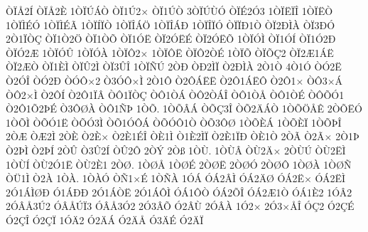{^^d2^^cf^^c52^^cd
^^d2^^cf^^c52^^c8
1^^d2^^cf^^da^^c1^^d2
^^d2^^cf1^^da2^^d7
^^d2^^cf1^^da^^d2
3^^d2^^cf^^da^^d9^^d3
^^d2^^cf^^c92^^d33
1^^d2^^cf^^cb^^cf^^ce
1^^d2^^cf^^cb^^d2
1^^d2^^cf^^cc^^c9^^d3
1^^d2^^cf^^cc^^c9^^c3
1^^d2^^cf^^cd^^cf^^d2
1^^d2^^cf^^ce^^c1^^d6
1^^d2^^cf^^ce^^c1^^d0
1^^d2^^cf^^ce^^cf^^d3
^^d2^^cf^^cf^^d01^^d2
^^d2^^cf2^^d0^^cc^^c0
^^d2^^cf3^^d0^^d3
2^^d21^^cf^^d2^^c7
^^d2^^cf1^^d22^^d6
^^d2^^cf1^^d2^^d5
^^d2^^cf1^^d3^^cb
^^d2^^cf2^^d3^^cb^^c9
^^d2^^cf2^^d3^^cb^^d5
1^^d2^^cf^^d3^^cc
^^d2^^cf1^^d3^^cd
^^d2^^cf1^^d32^^d0
^^d2^^cf^^d32^^c6
1^^d2^^cf^^d3^^db
1^^d2^^cf^^d3^^c0
1^^d2^^cf^^d42^^d7
1^^d2^^cf^^d4^^cb
^^d2^^cf^^d42^^d2^^c9
1^^d2^^cf^^d5
^^d2^^cf^^d5^^c72
^^d2^^cf2^^c61^^c1^^cb
^^d2^^cf2^^c6^^d2
^^d2^^cf1^^c8^^cc
^^d2^^cf^^db2^^cc
^^d2^^cf3^^db^^ce
1^^d2^^cf^^d1^^da
2^^d2^^d0
^^d2^^d02^^cc^^cf
^^d22^^d0^^cc^^c0
2^^d21^^d2
4^^d21^^d3
^^d2^^d32^^cb
^^d22^^d3^^ce
^^d2^^d32^^d0
^^d2^^d3^^d4^^d72
^^d23^^d3^^d4^^d7^^cc
2^^d21^^d4
^^d22^^d4^^c1^^cb^^cb
^^d22^^d41^^c1^^cb^^d4
^^d22^^d41^^d7
^^d2^^d43^^d7^^c1
^^d2^^d42^^d7^^cc
^^d22^^d4^^cd
^^d22^^d41^^cf^^c2
^^d2^^d41^^cf^^d2^^c7
^^d2^^d41^^d2^^c1
^^d2^^d42^^d2^^c1^^ce
^^d2^^d41^^d2^^c5
^^d2^^d41^^d2^^c9
^^d2^^d4^^d5^^d31
^^d22^^d41^^d52^^de^^c9
^^d23^^d4^^d8^^c0
^^d2^^d41^^d1^^de
1^^d2^^d5.
1^^d2^^d5^^c2^^c1
^^d2^^d5^^c73^^ce
^^d2^^d52^^c4^^c1^^d2
1^^d2^^d5^^d6^^c5^^ca
2^^d2^^d5^^cb^^d3
1^^d2^^d5^^cc
^^d2^^d5^^d31^^cb
^^d2^^d5^^d33^^cc
^^d2^^d51^^d3^^d4^^c1
^^d2^^d5^^d3^^d41^^d2
^^d2^^d53^^d4^^d8
1^^d2^^d5^^c8^^c1
1^^d2^^d5^^c8^^cf
1^^d2^^d5^^de^^ce
2^^d2^^c6
^^d2^^c62^^cc
2^^d2^^c8
^^d22^^c8^^d7
^^d22^^c81^^c9^^ce
^^d2^^c81^^cc
^^d21^^c82^^cc^^cf
^^d22^^c81^^cf^^d0
^^d2^^c81^^d2
2^^d2^^c3
^^d22^^c3^^d7
2^^d21^^de
^^d22^^de^^cc
^^d22^^de^^cd
2^^d2^^db
^^d23^^db2^^cd
^^d2^^db2^^d4
2^^d2^^dd
2^^d2^^df
1^^d2^^d9.
1^^d2^^d9^^c2
^^d2^^d92^^c4^^d7
2^^d2^^d9^^da
^^d2^^d92^^cb^^cc
1^^d2^^d9^^cd
^^d2^^d92^^d31^^cb
^^d2^^d92^^c81
2^^d2^^d8.
1^^d2^^d8^^c5
1^^d2^^d8^^c9
2^^d2^^d8^^cb
2^^d2^^d8^^d3
2^^d2^^d8^^d4
1^^d2^^d8^^c0
1^^d2^^d8^^d1
^^d2^^dc1^^cc
^^d22^^c0
1^^d2^^c0.
1^^d2^^c0^^d3
^^d2^^d11^^d7^^c9
1^^d2^^d1^^c0
1^^d3^^c1
^^d3^^c12^^c2^^cc
^^d3^^c12^^c4^^d8
^^d3^^c12^^cb^^d7
^^d3^^c12^^cb^^cc
2^^d31^^c1^^cc^^d8^^d0
^^d31^^c1^^d0^^d0
2^^d31^^c1^^d2^^cb
2^^d31^^c1^^d4^^cc
^^d3^^c11^^d4^^d2
^^d3^^c12^^d5^^ce
^^d3^^c12^^c61^^d2
^^d3^^c11^^c82
1^^d3^^c22
2^^d3^^c2^^c53^^da2
^^d3^^c2^^c5^^da^^cf3
^^d3^^c2^^c53^^d32
2^^d33^^c2^^d5
^^d32^^c2^^d9
2^^d3^^c2^^c0
1^^d32^^d7
2^^d33^^d7^^c5^^ce
^^d3^^c72
^^d32^^c7^^c9
^^d32^^c7^^ce
^^d32^^c7^^cf
1^^d3^^c42
^^d32^^c4^^c1
^^d32^^c4^^c5
^^d33^^c4^^c9
^^d32^^c4^^cf
}
